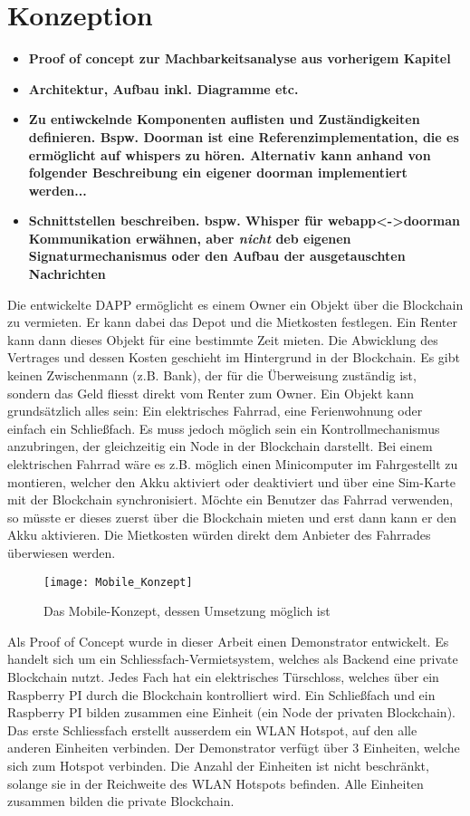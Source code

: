 \section{Konzeption}
\label{sec:Konzeption}
\begin{itemize}
    \item \textbf{Proof of concept zur Machbarkeitsanalyse aus vorherigem Kapitel}
    \item \textbf{Architektur, Aufbau inkl. Diagramme etc.}
    \item \textbf{Zu entiwckelnde Komponenten auflisten und Zuständigkeiten definieren. Bspw. Doorman ist eine Referenzimplementation, die es ermöglicht auf whispers zu hören. Alternativ kann anhand von folgender Beschreibung ein eigener doorman implementiert werden...}
    \item \textbf{Schnittstellen beschreiben. bspw. Whisper für webapp<->doorman Kommunikation erwähnen, aber \emph{nicht} deb eigenen Signaturmechanismus oder den Aufbau der ausgetauschten Nachrichten}
\end{itemize}

Die entwickelte DAPP ermöglicht es einem Owner ein Objekt über die Blockchain zu vermieten. Er kann dabei das Depot und die Mietkosten festlegen. Ein Renter kann dann dieses Objekt für eine bestimmte Zeit mieten. Die Abwicklung des Vertrages und dessen Kosten geschieht im Hintergrund in der Blockchain. Es gibt keinen Zwischenmann (z.B. Bank), der für die Überweisung zuständig ist, sondern das Geld fliesst direkt vom Renter zum Owner. 
Ein Objekt kann grundsätzlich alles sein: Ein elektrisches Fahrrad, eine Ferienwohnung oder einfach ein Schließfach. Es muss jedoch möglich sein ein Kontrollmechanismus anzubringen, der gleichzeitig ein Node in der Blockchain darstellt. Bei einem elektrischen Fahrrad wäre es z.B. möglich einen Minicomputer im Fahrgestellt zu montieren, welcher den Akku aktiviert oder deaktiviert und über eine Sim-Karte mit der Blockchain synchronisiert. Möchte ein Benutzer das Fahrrad verwenden, so müsste er dieses zuerst über die Blockchain mieten und erst dann kann er den Akku aktivieren. Die Mietkosten würden direkt dem Anbieter des Fahrrades überwiesen werden.

\begin{figure}
\centering
\texttt{[image: Mobile\_Konzept]}
\caption{Das Mobile-Konzept, dessen Umsetzung möglich ist}
\label{fig:Mobile_Konzept}
\end{figure}

\vspace{1em}
Als Proof of Concept wurde in dieser Arbeit einen Demonstrator entwickelt. Es handelt sich um ein Schliessfach-Vermietsystem, welches als Backend eine private Blockchain nutzt. Jedes Fach hat ein elektrisches Türschloss, welches über ein Raspberry PI durch die Blockchain kontrolliert wird. Ein Schließfach und ein Raspberry PI bilden zusammen eine Einheit (ein Node der privaten Blockchain). Das erste Schliessfach erstellt ausserdem ein WLAN Hotspot, auf den alle anderen Einheiten verbinden. Der Demonstrator verfügt über 3 Einheiten, welche sich zum Hotspot verbinden. Die Anzahl der Einheiten ist nicht beschränkt, solange sie in der Reichweite des WLAN Hotspots befinden. Alle Einheiten zusammen bilden die private Blockchain. 

